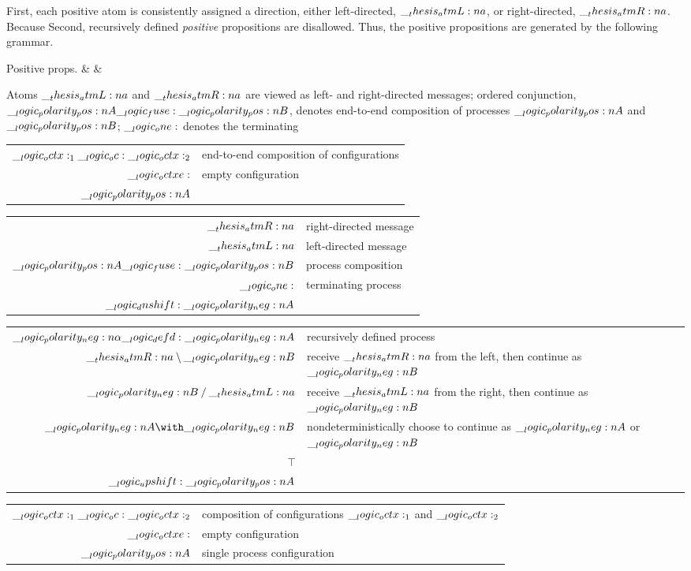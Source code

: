 First, each positive atom is consistently assigned a direction, either left-directed, $\__thesis_atmL:n {a}$, or right-directed, $\__thesis_atmR:n {a}$.
Because 
Second, recursively defined \emph{positive} propositions are disallowed.
Thus, the positive propositions are generated by the following grammar.
\begin{syntax*}
  Positive props. &
     &  \mid {} \mid {} \fuse {} \mid \one \mid \dn {}
\end{syntax*}
Atoms $\__thesis_atmL:n {a}$ and $\__thesis_atmR:n {a}$ are viewed as left- and right-directed messages; ordered conjunction, $\__logic_polarity_pos:n {A} \__logic_fuse: \__logic_polarity_pos:n {B}$, denotes end-to-end composition of processes $\__logic_polarity_pos:n {A}$ and $\__logic_polarity_pos:n {B}$; $\__logic_one:$ denotes the terminating 

\begin{tabular}{@{}rl@{}}
  $\__logic_octx:_1 \__logic_oc: \__logic_octx:_2$ & end-to-end composition of configurations \\
  $\__logic_octxe:$ & empty configuration \\
  $\__logic_polarity_pos:n {A}$ & 
\end{tabular}

\begin{tabular}{@{}rl@{}}
  $\__thesis_atmR:n {a}$ & right-directed message \\
  $\__thesis_atmL:n {a}$ & left-directed message \\
  $\__logic_polarity_pos:n {A} \__logic_fuse: \__logic_polarity_pos:n {B}$ & process composition \\
  $\__logic_one:$ & terminating process \\
  $\__logic_dnshift: \__logic_polarity_neg:n {A}$ & 
\end{tabular}

\begin{tabular}{@{}rl@{}}
  $\__logic_polarity_neg:n {\alpha} \__logic_defd: \__logic_polarity_neg:n {A}$ & recursively defined process \\
  $\__thesis_atmR:n {a} \mathbin { \setminus } \__logic_polarity_neg:n {B}$ & receive $\__thesis_atmR:n {a}$ from the left, then continue as $\__logic_polarity_neg:n {B}$ \\
  $\__logic_polarity_neg:n {B} \mathbin { / } \__thesis_atmL:n {a}$ & receive $\__thesis_atmL:n {a}$ from the right, then continue as $\__logic_polarity_neg:n {B}$ \\
  $\n{A} \with \n{B}$ & nondeterministically choose to continue as $\__logic_polarity_neg:n {A}$ or $\__logic_polarity_neg:n {B}$ \\
  $\top$ & \\
  $\__logic_upshift: \__logic_polarity_pos:n {A}$ &
\end{tabular}

\begin{tabular}{@{}rl@{}}
  $\__logic_octx:_1 \__logic_oc: \__logic_octx:_2$ & composition of configurations $\__logic_octx:_1$ and $\__logic_octx:_2$ \\
  $\__logic_octxe:$ & empty configuration \\
  $\__logic_polarity_pos:n {A}$ & single process configuration
\end{tabular}


